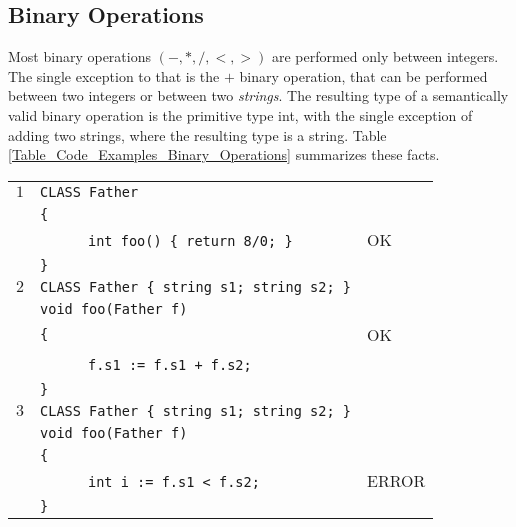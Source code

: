 \documentclass{article}
\begin{document}
\subsection{Binary Operations}
\label{subsection_Binary_Operations}
Most binary operations $(-,*,/,<,>)$ are performed only between integers.
The single exception to that is the $+$ binary operation,
that can be performed between two integers or between two \textit{strings}.
The resulting type of a semantically valid binary operation is the primitive type int,
with the single exception of adding two strings, where the resulting type is a string.
Table \ref{Table_Code_Examples_Binary_Operations} summarizes these facts.
\begin{table}[h]
\centering
\begin{tabular}{|l|l|l|}
\hline
 $1$ & \verb"CLASS Father"                     &    \\
     & \verb"{"                                &    \\
     & ~ ~ ~ ~\verb"int foo() { return 8/0; }" & OK \\
     & \verb"}"                                &    \\
\hline
 $2$ & \verb"CLASS Father { string s1; string s2; }" &    \\
     & \verb"void foo(Father f)"                     &    \\
     & \verb"{"                                      & OK \\
     & ~ ~ ~ ~\verb"f.s1 := f.s1 + f.s2;"            &    \\
     & \verb"}"                                      &    \\
\hline
 $3$ & \verb"CLASS Father { string s1; string s2; }" &       \\
     & \verb"void foo(Father f)"                     &       \\
     & \verb"{"                                      &       \\
     & ~ ~ ~ ~\verb"int i := f.s1 < f.s2;"           & ERROR \\
     & \verb"}"                                      &       \\

\end{tabular}
\end{table}
\end{document}
